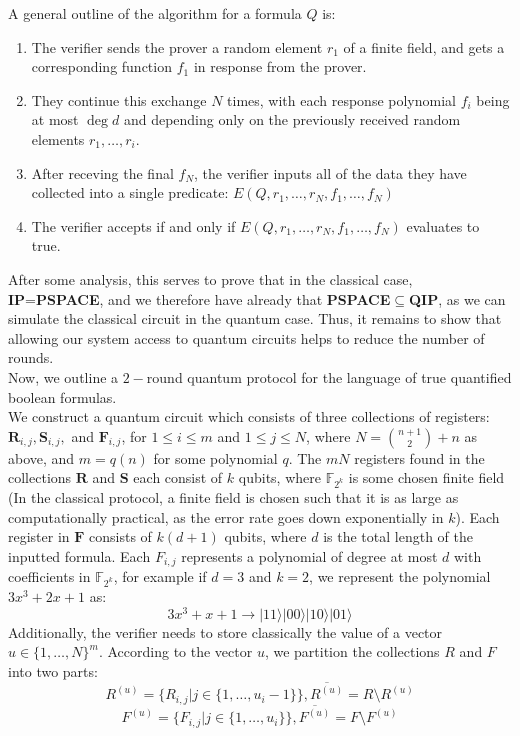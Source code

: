 \documentclass[12pt]{article}
\numberwithin{thm}{section}
\numberwithin{defn}{section}
\numberwithin{prop}{section}
\numberwithin{rmk}{section}
\newcommand{\ket}[1]{\vert #1 \rangle}
\begin{document}
	\noindent A general outline of the algorithm for a formula $Q$ is:
	 \begin{enumerate}
	 	\item The verifier sends the prover a random element $r_1$ of a finite field, and gets a corresponding function $f_1$ in response from the prover.
	 	\item They continue this exchange $N$ times, with each response polynomial $f_i$ being at most $\deg d$ and  depending only on the previously received random elements $r_1,\dots,r_{i}$. 
	 	\item After receving  the final $f_N$, the verifier inputs all of the data they have collected into a single predicate: $E(Q,r_1,\dots,r_N,f_1,\dots,f_N)$
	 	\item The verifier accepts if and only if $E(Q,r_1,\dots,r_N,f_1,\dots,f_N)$ evaluates to true.
	 \end{enumerate}
	 	
	After some analysis, this serves to prove that in the classical case, \textbf{IP}=\textbf{PSPACE}, and we therefore have already that \textbf{PSPACE}$\subseteq$\textbf{QIP}, as we can simulate the classical circuit in the quantum case. Thus, it remains to show that allowing our system access to quantum circuits helps to reduce the number of rounds.\\
	
	Now, we outline a $2-$round quantum protocol for the language of true quantified boolean formulas. \\
	
	We construct a quantum circuit which consists of three collections of registers: $\textbf{R}_{i,j},\textbf{S}_{i,j},$ and $\textbf{F}_{i,j}$, for $1\leq i\leq m$ and $1\leq j\leq N$, where $N={{n+1}\choose{2}}+n$ as above, and $m=q(n)$ for some polynomial $q$. The $mN$ registers found in the collections $\textbf{R}$ and $\textbf{S}$ each consist of $k$ qubits, where $\mathbb{F}_{2^k}$ is some chosen finite field (In the classical protocol, a finite field is chosen such that it is as large as computationally practical, as the error rate goes down exponentially in $k$). Each register in $\textbf{F}$ consists of $k(d+1)$ qubits, where $d$ is the total length of the inputted formula. Each $F_{i,j}$ represents a polynomial of degree at most $d$ with coefficients in $\mathbb{F}_{2^k}$, for example if $d=3$ and $k=2$, we represent the polynomial $3x^3+2x+1$ as:
	\[3x^3+x+1\to \ket{11}\ket{00}\ket{10}\ket{01}\]
	Additionally, the verifier needs to store classically the value of a vector $u\in\{1,\dots,N\}^m$. According to the vector $u$, we partition the collections $R$ and $F$ into two parts:
	\[R^{(u)}=\{R_{i,j}|j\in\{1,\dots,u_i-1\}\}, \overline{R^{(u)}}=R \setminus R^{(u)}\]
	\[F^{(u)}=\{F_{i,j}|j\in\{1,\dots,u_i\}\}, \overline{F^{(u)}}=F \setminus F^{(u)}\]
	
\end{document}

